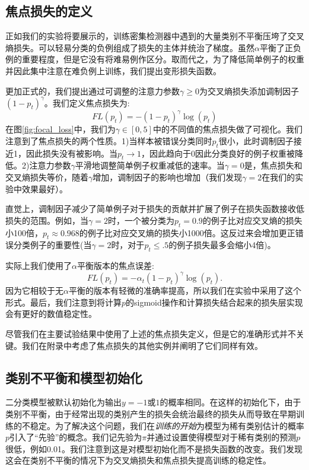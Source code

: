 \documentclass{ctexart}
\begin{document}
\subsection{焦点损失的定义}
正如我们的实验将要展示的，训练密集检测器中遇到的大量类别不平衡压垮了交叉熵损失。可以轻易分类的负例组成了损失的主体并统治了梯度。虽然$\alpha$平衡了正负例的重要程度，但是它没有将难易例作区分。取而代之，为了降低简单例子的权重并因此集中注意在难负例上训练，我们提出变形损失函数。\par
更加正式的，我们提出通过可调整的注意力参数$\gamma \ge 0$为交叉熵损失添加调制因子$(1-p_t)^\gamma$。我们定义焦点损失为:
\begin{equation}
    FL(p_t)=-(1-p_t)^\gamma\log(p_t)
\end{equation}
在图\ref{fig:focal_loss}中，我们为$\gamma \in [0, 5]$中的不同值的焦点损失做了可视化。我们注意到了焦点损失的两个性质。1)当样本被错误分类同时$p_t$很小，此时调制因子接近1，因此损失没有被影响。当$p_t\rightarrow 1$，因此趋向于0因此分类良好的例子权重被降低。2)注意力参数$\gamma$平滑地调整简单例子权重减低的速率。当$\gamma=0$是，焦点损失和交叉熵损失等价，随着$\gamma$增加，调制因子的影响也增加（我们发现$\gamma=2$在我们的实验中效果最好）。\par
直觉上，调制因子减少了简单例子对于损失的贡献并扩展了例子在损失函数接收低损失的范围。例如，当$\gamma=2$时，一个被分类为$p_t=0.9$的例子比对应交叉熵的损失小100倍，$p_t\approx 0.968$的例子比对应交叉熵的损失小1000倍。这反过来会增加更正错误分类例子的重要性(当$\gamma = 2$时，对于$p_t \leq .5$的例子损失最多会缩小4倍)。\par
实际上我们使用了$\alpha$平衡版本的焦点误差:
\begin{equation}
    FL(p_t)=-\alpha_t(1-p_t)^\gamma\log(p_t).
\end{equation}
因为它相较于无$\alpha$平衡的版本有轻微的准确率提高，所以我们在实验中采用了这个形式。最后，我们注意到将计算$p$的sigmoid操作和计算损失结合起来的损失层实现会有更好的数值稳定性。\par
尽管我们在主要试验结果中使用了上述的焦点损失定义，但是它的准确形式并不关键。我们在附录中考虑了焦点损失的其他实例并阐明了它们同样有效。
\subsection{类别不平衡和模型初始化}
二分类模型被默认初始化为输出$y=-1$或$1$的概率相同。在这样的初始化下，由于类别不平衡，由于经常出现的类别产生的损失会统治最终的损失从而导致在早期训练的不稳定。为了解决这个问题，我们在\textit{训练的开始}为模型为稀有类别估计的概率$p$引入了“先验”的概念。我们记先验为$\pi$并通过设置使得模型对于稀有类别的预测$p$很低，例如0.01。我们注意到这是对模型初始化而不是损失函数的改变。我们发现这会在类别不平衡的情况下为交叉熵损失和焦点损失提高训练的稳定性。
\end{document}
